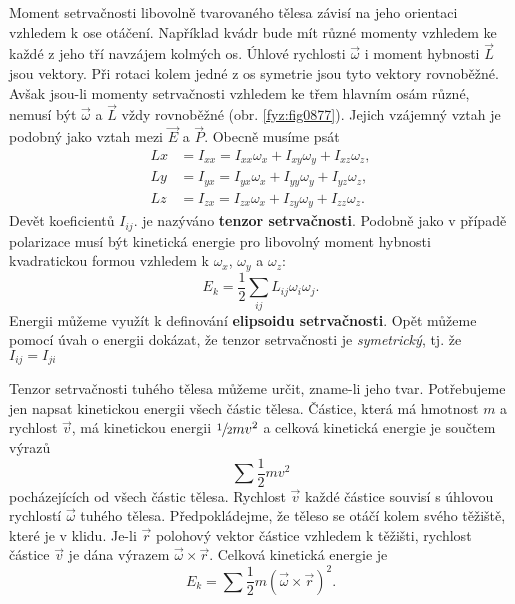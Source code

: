     Moment setrvačnosti libovolně tvarovaného tělesa závisí na jeho orientaci vzhledem k ose
    otáčení. Například kvádr bude mít různé momenty vzhledem ke každé z jeho tří navzájem kolmých
    os. Úhlové rychlosti \(\vec{ω}\) i moment hybnosti \(\vec{L}\) jsou vektory. Při rotaci kolem
    jedné z os symetrie jsou tyto vektory rovnoběžné. Avšak jsou-li momenty setrvačnosti vzhledem ke
    třem hlavním osám různé, nemusí být \(\vec{ω}\) a \(\vec{L}\) vždy rovnoběžné (obr.
    \ref{fyz:fig0877}). Jejich vzájemný vztah je podobný jako vztah mezi \(\vec{E}\) a \(\vec{P}\).
    Obecně musíme psát
    \begin{align}
      Lx&=I_{xx}=I_{xx}ω_x+I_{xy}ω_y+I_{xz}ω_z,  \nonumber         \\
      Ly&=I_{yx}=I_{yx}ω_x+I_{yy}ω_y+I_{yz}ω_z,  \label{fyz:eq944} \\
      Lz&=I_{zx}=I_{zx}ω_x+I_{zy}ω_y+I_{zz}ω_z.  \nonumber 
    \end{align}
    Devět koeficientů \(I_{ij}\). je nazýváno \textbf{tenzor setrvačnosti}. Podobně jako v případě
    polarizace musí být kinetická energie pro libovolný moment hybnosti kvadratickou formou vzhledem
    k \(ω_x\), \(ω_y\) a \(ω_z\):
    \begin{equation}\label{fyz:eq945}
      E_k = \frac{1}{2}\sum_{ij}L_{ij}ω_iω_j.
    \end{equation}
    Energii můžeme využít k definování \textbf{elipsoidu setrvačnosti}. Opět můžeme pomocí úvah o
    energii dokázat, že tenzor setrvačnosti je \emph{symetrický}, tj. že \(I_{ij} = I_{ji}\)

    Tenzor setrvačnosti tuhého tělesa můžeme určit, zname-li jeho tvar. Potřebujeme jen napsat
    kinetickou energii všech částic tělesa. Částice, která má hmotnost \(m\) a rychlost \(\vec{v}\),
    má kinetickou energii \(\sfrac{1}{2}mv^2\) a celková kinetická energie je součtem výrazů
    \[\sum\frac{1}{2}mv^2\] pocházejících od všech částic tělesa. Rychlost \(\vec{v}\) každé částice
    souvisí s úhlovou rychlostí \(\vec{ω}\) tuhého tělesa. Předpokládejme, že těleso se otáčí kolem
    svého těžiště, které je v klidu. Je-li \(\vec{r}\) polohový vektor částice vzhledem k těžišti,
    rychlost částice \(\vec{v}\) je dána výrazem \(\vec{ω}\times\vec{r}\). Celková kinetická energie
    je
    \begin{equation}\label{fyz:eq948}
      E_k = \sum\frac{1}{2}m\left(\vec{ω}\times\vec{r}\right)^2.
    \end{equation}

    
